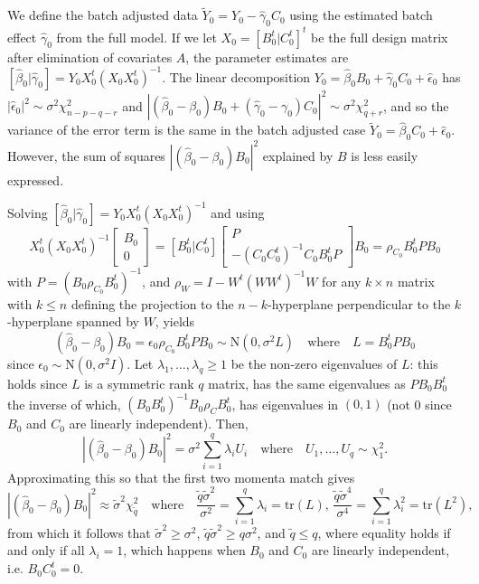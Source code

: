 \documentclass{bio}
\begin{document}
We define the batch adjusted data $\tilde Y_0=Y_0-\hat\gamma_0C_0$ using the estimated batch effect $\hat\gamma_0$ from the full model. If we let $X_0=[B_0^t| C_0^t]^t$ be the full design matrix after elimination of covariates $A$, the parameter estimates are $[\hat\beta_0|\hat\gamma_0]=Y_0X_0^t(X_0X_0^t)^{-1}$. The linear decomposition $Y_0=\hat\beta_0B_0+\hat\gamma_0C_0+\hat\epsilon_0$ has $|\hat\epsilon_0|^2\sim\sigma^2\chi^2_{n-p-q-r}$ and
$|(\hat\beta_0-\beta_0)B_0+(\hat\gamma_0-\gamma_0)C_0|^2\sim\sigma^2\chi^2_{q+r}$, and so the variance of the error term is the same in the batch adjusted case $\tilde Y_0=\hat\beta_0C_0+\hat\epsilon_0$. However, the sum of squares $|(\hat\beta_0-\beta_0)B_0|^2$ explained by $B$ is less easily expressed.

Solving $[\hat\beta_0|\hat\gamma_0]=Y_0X_0^t(X_0X_0^t)^{-1}$ and using
\begin{equation}
X_0^t(X_0X_0^t)^{-1} \begin{bmatrix}B_0\\0\end{bmatrix}
=[B_0^t|C_0^t] \begin{bmatrix}P\\-(C_0C_0^t)^{-1}C_0B_0^tP\end{bmatrix} B_0
=\rho_{C_0}B_0^tPB_0
\end{equation}
with $P=(B_0\rho_{C_0}B_0^t)^{-1}$, and $\rho_{W}=I-W^t(WW^t)^{-1}W$ for any $k\times n$ matrix with $k\le n$ defining the projection to the $n-k$-hyperplane perpendicular to the $k$-hyperplane spanned by $W$, yields
\begin{equation}
(\hat\beta_0-\beta_0)B_0=\epsilon_0\rho_{C_0}B_0^tPB_0\sim\text{N}(0,\sigma^2L)
\quad\text{where}\quad
L=B_0^tPB_0
\end{equation}
since $\epsilon_0\sim\text{N}(0,\sigma^2I)$. Let $\lambda_1,\ldots,\lambda_q\ge1$ be the non-zero eigenvalues of $L$: this holds since $L$ is a symmetric rank $q$ matrix,  has the same eigenvalues as $PB_0B_0^t$ the inverse of which, $(B_0B_0^t)^{-1}B_0\rho_{C}B_0^t$, has eigenvalues in $(0,1)$ (not 0 since $B_0$ and $C_0$ are linearly independent). Then,
\begin{equation}
|(\hat\beta_0-\beta_0)B_0|^2=\sigma^2\sum_{i=1}^q\lambda_iU_i
\quad\text{where}\quad
U_1,\ldots,U_q\sim\chi^2_1.
\end{equation}
Approximating this so that the first two momenta match gives
\begin{equation}
|(\hat\beta_0-\beta_0)B_0|^2\approx\tilde\sigma^2\chi^2_{\tilde q}
\quad\text{where}\quad
\frac{\tilde q\tilde\sigma^2}{\sigma^2}=\sum_{i=1}^q\lambda_i=\text{tr}(L),\,
\frac{\tilde q\tilde\sigma^4}{\sigma^4}=\sum_{i=1}^q\lambda_i^2=\text{tr}(L^2),
\end{equation}
from which it follows that $\tilde\sigma^2\ge\sigma^2$, $\tilde q\tilde\sigma^2\ge q\sigma^2$, and $\tilde q\le q$, where equality holds if and only if all $\lambda_i=1$, which happens when $B_0$ and $C_0$ are linearly independent, i.e. $B_0C_0^t=0$.
\end{document}
